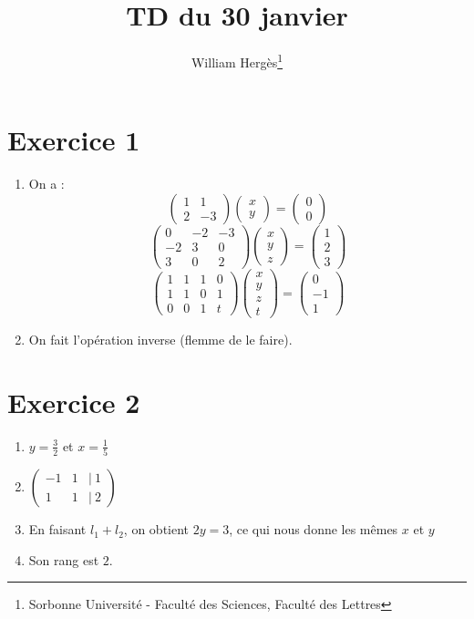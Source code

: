 \documentclass[a4paper, titlepage]{article}
\title{TD du 30 janvier}
\author{William Hergès\thanks{Sorbonne Université - Faculté des Sciences, Faculté des Lettres}}
\begin{document}
	\maketitle
	\tableofcontents
	\newpage
	\section*{Exercice 1}
	\begin{enumerate}
		\item On a :
			$$ \begin{pmatrix} 1&1\\2&-3 \end{pmatrix} \begin{pmatrix} x\\y \end{pmatrix} = \begin{pmatrix} 0\\0 \end{pmatrix} $$
			$$ \begin{pmatrix} 0&-2&-3\\ -2&3&0\\3&0&2 \end{pmatrix} \begin{pmatrix} x\\y\\z \end{pmatrix} = \begin{pmatrix} 1\\2\\3 \end{pmatrix} $$
			$$ \begin{pmatrix} 1&1&1&0\\1&1&0&1\\0&0&1&t \end{pmatrix} \begin{pmatrix} x\\y\\z\\t \end{pmatrix} = \begin{pmatrix} 0\\-1\\1 \end{pmatrix} $$
		\item On fait l'opération inverse (flemme de le faire).
	\end{enumerate}
	\section*{Exercice 2}
	\begin{enumerate}
		\item $y=\frac{3}{2}$ et $x=\frac{1}{5}$
		\item $\begin{pmatrix} -1&1&|~1\\ 1&1&|~2 \end{pmatrix}$
		\item En faisant $l_1+l_2$, on obtient $2y=3$, ce qui nous donne les mêmes $x$ et $y$
		\item Son rang est $2$.
	\end{enumerate}
\end{document}
